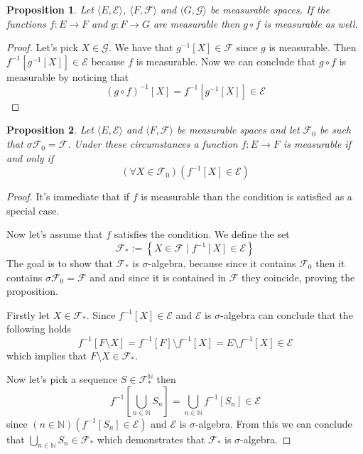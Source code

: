 \documentclass[a4paper]{amsart}
\newtheorem{prop}{Proposition}
\newcommand{\pair}[2]{\langle #1, #2\rangle}
\newcommand{\NN}{\mathbb{N}}
\begin{document}
\begin{prop}
    Let $\pair{E}{\mathcal{E}}$, $\pair{F}{\mathcal{F}}$ and
    $\pair{G}{\mathcal{G}}$ be measurable spaces. If the 
    functions $f : E \longrightarrow F$ and
    $g: F \longrightarrow G$ are measurable then $g \circ f$ is 
    measurable as well.
\end{prop}

\begin{proof}
    Let's pick $X \in \mathcal{G}$. We have that $ g^{-1}[X] \in \mathcal{F}$ since $g$ is measurable. 
    Then $f^{-1}[g^{-1}[X] ] \in \mathcal{E}$ 
    because $f$ is measurable. Now we 
    can conclude that $g \circ f$ is measurable by noticing 
    that
    $$
    \left(g \circ f\right)^{-1}[X] = f^{-1}[g^{-1}[X] ] \in \mathcal{E}
    $$
\end{proof}

\begin{prop}
    Let  $\pair{E}{\mathcal{E}}$ and $\pair{F}{\mathcal{F}}$ be 
    measurable spaces and let $\mathcal{F}_0$ be such that
    $\sigma\mathcal{F}_0 = \mathcal{F}$. Under these 
    circumstances a function $f : E \longrightarrow F$ is
    measurable if and only if 
    $$
    \left( \forall X \in \mathcal{F}_0\right)
    \left( f^{-1}[X] \in \mathcal{E}\right)
    $$
\end{prop}

\begin{proof}
    It's immediate that if $f$ is measurable than the condition 
    is satisfied as a special case.
    
    Now let's assume that $f$ satisfies the condition. We 
    define the set
    $$
    \mathcal{F}_* := \left\{ X \in \mathcal{F} \mid  f^{-1}[X] \in \mathcal{E} \right\}
    $$
    The goal is to show that $\mathcal{F}_*$ is
    $\sigma$-algebra, because since it contains $\mathcal{F}_0$ 
    then it contains $\sigma\mathcal{F}_0 = \mathcal{F}$ and 
    and since it is contained in $\mathcal{F}$ they coincide, 
    proving the proposition.
    
    Firstly let $X \in \mathcal{F}_*$. Since $f^{-1}[X] \in \mathcal{E}$
    and $\mathcal{E}$ is $\sigma$-algebra can conclude  that 
    the following holds
    $$
    f^{-1}[F\setminus X] = f^{-1}[F] \setminus f^{-1}[X] = E \setminus f^{-1}[X] \in \mathcal{E}
    $$
    which implies that $F\setminus X\in \mathcal{F}_*$.
    
    Now let's pick a sequence $S \in \mathcal{F}_*^\NN$ then
    $$
    f^{-1}\left[ \bigcup\limits_{n \in \NN} S_n \right] = 
    \bigcup\limits_{n \in \NN} f^{-1}[S_n] \in \mathcal{E}
    $$
    since $\left(n \in \NN \right) \left(f^{-1}[S_n] \in \mathcal{E}\right)$ and 
    $\mathcal{E}$ is $\sigma$-algebra. From this we can conclude
    that $\bigcup\limits_{n \in \NN} S_n \in \mathcal{F}_*$
    which demonstrates that $\mathcal{F}_*$ is $\sigma$-algebra.
\end{proof}
\end{document}
